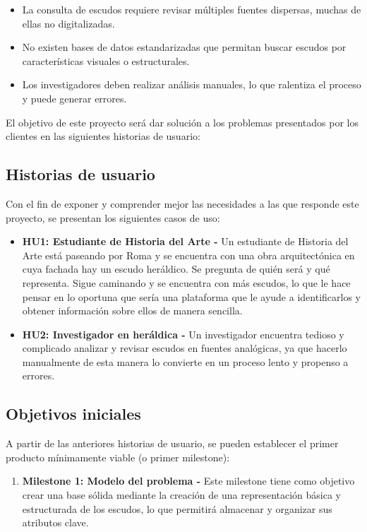 \begin{itemize}
    \item La consulta de escudos requiere revisar múltiples fuentes dispersas, 
    muchas de ellas no digitalizadas.
    \item No existen bases de datos estandarizadas que permitan buscar escudos por
    características visuales o estructurales.
    \item Los investigadores deben realizar análisis manuales, lo que ralentiza el
    proceso y puede generar errores.
\end{itemize}

El objetivo de este proyecto será dar solución a los problemas presentados por los
clientes en las siguientes historias de usuario:

\subsection{Historias de usuario}
Con el fin de exponer y comprender mejor las necesidades a las que responde este
proyecto, se presentan los siguientes casos de uso:

\begin{itemize}
    \item \textbf{HU1: Estudiante de Historia del Arte - }Un estudiante de Historia del 
    Arte está paseando por Roma y se encuentra con una obra arquitectónica en cuya fachada
    hay un escudo heráldico. Se pregunta de quién será y qué representa. Sigue caminando 
    y se encuentra con más escudos, lo que le hace pensar en lo oportuna que sería una 
    plataforma que le ayude a identificarlos y obtener información sobre ellos de manera 
    sencilla.
    \item \textbf{HU2: Investigador en heráldica - }Un investigador encuentra tedioso y
    complicado analizar y revisar escudos en fuentes analógicas, ya que hacerlo manualmente
    de esta manera lo convierte en un proceso lento y propenso a errores.
\end{itemize}

\subsection{Objetivos iniciales}
A partir de las anteriores historias de usuario, se pueden establecer el primer
producto mínimamente viable (o primer milestone):
\begin{enumerate}
    \item \textbf{Milestone 1: Modelo del problema - }Este milestone tiene como objetivo
    crear una base sólida mediante la creación de una representación básica y estructurada
    de los escudos, lo que permitirá almacenar y organizar sus atributos clave.
\end{enumerate}

